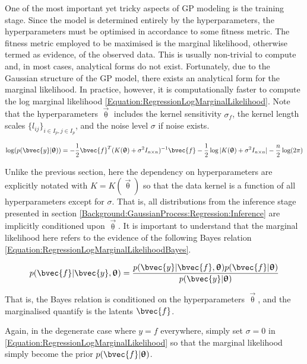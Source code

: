 				One of the most important yet tricky aspects of GP modeling is the training stage. Since the model is determined entirely by the hyperparameters, the hyperparameters must be optimised in accordance to some fitness metric. The fitness metric employed to be maximised is the marginal likelihood, otherwise termed as evidence, of the observed data. This is usually non-trivial to compute and, in most cases, analytical forms do not exist. Fortunately, due to the Gaussian structure of the GP model, there exists an analytical form for the marginal likelihood. In practice, however, it is computationally faster to compute the log marginal likelihood \eqref{Equation:RegressionLogMarginalLikelihood}. Note that the hyperparameters $\vec{\uptheta}$ includes the kernel sensitivity $\sigma_{f}$, the kernel length scales $\{l_{ij}\}_{i \in I_{p}, j \in I_{p}}$, and the noise level $\sigma$ if noise exists.
				
				\begin{equation}
					\log(p(\bvec{y} | \vec{\uptheta})) = - \frac{1}{2} \bvec{f}^{T} (K(\vec{\uptheta}) + \sigma^{2} I_{n \times n})^{-1} \bvec{f} - \frac{1}{2} \log|K(\vec{\uptheta}) + \sigma^{2} I_{n \times n}| - \frac{n}{2} \log(2 \pi)
				\label{Equation:RegressionLogMarginalLikelihood}
				\end{equation}
				
				Unlike the previous section, here the dependency on hyperparameters are explicitly notated with $K = K(\vec{\uptheta})$ so that the data kernel is a function of all hyperparameters except for $\sigma$. That is, all distributions from the inference stage presented in section \ref{Background:GaussianProcess:Regression:Inference} are implicitly conditioned upon $\vec{\uptheta}$. It is important to understand that the marginal likelihood here refers to the evidence of the following Bayes relation \eqref{Equation:RegressionLogMarginalLikelihoodBayes}.
				
				\begin{equation}
					p(\bvec{f} | \bvec{y}, \vec{\uptheta}) = \frac{p(\bvec{y} | \bvec{f}, \vec{\uptheta}) p(\bvec{f} | \vec{\uptheta})}{p(\bvec{y} | \vec{\uptheta})}
				\label{Equation:RegressionLogMarginalLikelihoodBayes}
				\end{equation}
				
				That is, the Bayes relation is conditioned on the hyperparameters $\vec{\uptheta}$, and the marginalised quantify is the latents $\bvec{f}$.
				
				Again, in the degenerate case where $y = f$ everywhere, simply set $\sigma = 0$ in \eqref{Equation:RegressionLogMarginalLikelihood} so that the marginal likelihood simply become the prior $p(\bvec{f} | \vec{\uptheta})$.
				
